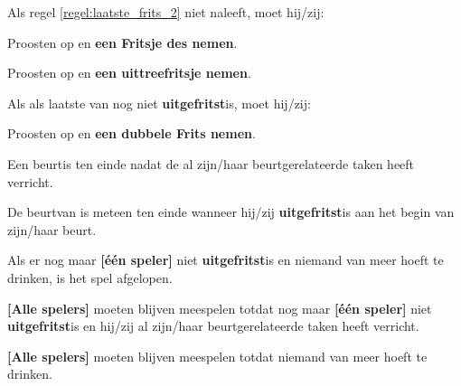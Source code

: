 \vervolgLijst{}
    \item Als \eenSpeler regel \ref{regel:laatste_frits_2} niet naleeft, moet hij/zij:
    \puntLijst{}
        \item Proosten op  en \textbf{een Fritsje des nemen}\footnotemark[3].
        \item Proosten op  en \textbf{een uittreefritsje nemen}\footnotemark[3].
    \eindPuntLijst{}
\eindLijst{}

\vervolgLijst{}
    \item Als \eenSpeler als laatste van \alleSpelers nog niet \textbf{uitgefritst}\footnotemark[2] is, moet hij/zij:
    \puntLijst{}
        \item Proosten op  en \textbf{een dubbele Frits nemen}\footnotemark[4].
    \eindPuntLijst{}
\eindLijst{}


\vervolgLijst{}
    \item Een beurt\footnotemark[1] is ten einde nadat de \huidigeSpeler al zijn/haar beurtgerelateerde taken heeft verricht.
\eindLijst{}

\vervolgLijst{}
    \item De beurt\footnotemark[1] van \eenSpeler is meteen ten einde wanneer hij/zij \textbf{uitgefritst}\footnotemark[2] is aan het begin van zijn/haar beurt. 
\eindLijst{}

\vervolgLijst{}
    \item Als er nog maar \textbf{[\'e\'en speler]} niet \textbf{uitgefritst}\footnotemark[2] is en niemand van \alleSpelers meer hoeft te drinken, is het spel afgelopen.
\eindLijst{}

\vervolgLijst{}
    \item \textbf{[Alle spelers]} moeten blijven meespelen totdat nog maar \textbf{[één speler]} niet \textbf{uitgefritst}\footnotemark[3] is en hij/zij al zijn/haar beurtgerelateerde taken heeft verricht.
\eindLijst{}  

\vervolgLijst{}
    \item \textbf{[Alle spelers]} moeten blijven meespelen totdat niemand van \alleSpelers meer hoeft te drinken.
\eindLijst{} 




